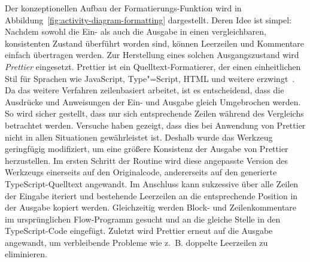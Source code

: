 \medskip
Der konzeptionellen Aufbau der Formatierungs-Funktion wird in Abbildung~\ref{fig:activity-diagram-formatting} dargestellt. Deren Idee ist simpel: Nachdem sowohl die Ein- als auch die Ausgabe in einen vergleichbaren, konsistenten Zustand überführt worden sind, können Leerzeilen und Kommentare einfach übertragen werden.
Zur Herstellung eines solchen Ausgangszustand wird \textit{Prettier} eingesetzt. Prettier ist ein Quelltext-Formatierer, der einen einheitlichen Stil für Sprachen wie JavaScript, Type"=Script, HTML und weitere erzwingt~\autocite{SOFTWARE:PRETTIER}.
Da das weitere Verfahren zeilenbasiert arbeitet, ist es entscheidend, dass die Ausdrücke und Anweisungen der Ein- und Ausgabe gleich Umgebrochen werden. So wird sicher gestellt, dass nur sich entsprechende Zeilen während des Vergleichs betrachtet werden. Versuche haben gezeigt, dass dies bei Anwendung von Prettier nicht in allen Situationen gewährleistet ist. Deshalb wurde das Werkzeug geringfügig modifiziert, um eine größere Konsistenz der Ausgabe von Prettier herzustellen.
Im ersten Schritt der Routine wird diese angepasste Version des Werkzeugs einerseits auf den Originalcode, andererseits auf den generierte TypeScript-Quelltext angewandt. Im Anschluss kann sukzessive über alle Zeilen der Eingabe iteriert und bestehende Leerzeilen an die entsprechende Position in der Ausgabe kopiert werden. Gleichzeitig werden Block- und Zeilenkommentare im ursprünglichen Flow-Programm gesucht und an die gleiche Stelle in den TypeScript-Code eingefügt. Zuletzt wird Prettier erneut auf die Ausgabe angewandt, um verbleibende Probleme wie z.~B. doppelte Leerzeilen zu eliminieren.

